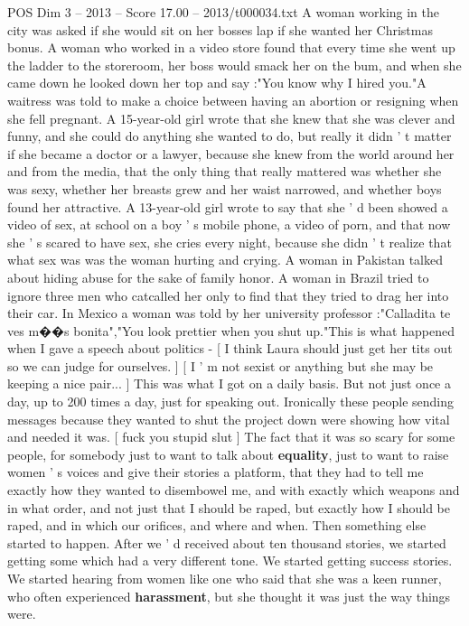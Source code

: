 \begin{textsample}{POS Dim 3 – 2013 – Score 17.00 – 2013/t000034.txt}
A woman working in the city was asked if she would sit on her bosses lap if she wanted her Christmas bonus.
A woman who worked in a video store found that every time she went up the ladder to the storeroom, her boss would smack her on the bum, and when she came down he looked down her top and say :"You know why I hired you."A waitress was told to make a choice between having an abortion or resigning when she fell pregnant.
A 15-year-old girl wrote that she knew that she was clever and funny, and she could do anything she wanted to do, but really it didn ' t matter if she became a doctor or a lawyer, because she knew from the world around her and from the media, that the only thing that really mattered was whether she was sexy, whether her breasts grew and her waist narrowed, and whether boys found her attractive.
A 13-year-old girl wrote to say that she ' d been showed a video of sex, at school on a boy ' s mobile phone, a video of porn, and that now she ' s scared to have sex, she cries every night, because she didn ' t realize that what sex was was the woman hurting and crying.
A woman in Pakistan talked about hiding abuse for the sake of family honor.
A woman in Brazil tried to ignore three men who catcalled her only to find that they tried to drag her into their car.
In Mexico a woman was told by her university professor :"Calladita te ves m{\EmojiFont �}{\EmojiFont �}s bonita","You look prettier when you shut up."This is what happened when I gave a speech about politics - [ I think Laura should just get her tits out so we can judge for ourselves. ] [ I ' m not sexist or anything but she may be keeping a nice pair... ] This was what I got on a daily basis.
But not just once a day, up to 200 times a day, just for speaking out.
Ironically these people sending messages because they wanted to shut the project down were showing how vital and needed it was. [ fuck you stupid slut ] The fact that it was so scary for some people, for somebody just to want to talk about \textbf{equality}, just to want to raise women ' s voices and give their stories a platform, that they had to tell me exactly how they wanted to disembowel me, and with exactly which weapons and in what order, and not just that I should be raped, but exactly how I should be raped, and in which our orifices, and where and when.
Then something else started to happen.
After we ' d received about ten thousand stories, we started getting some which had a very different tone.
We started getting success stories.
We started hearing from women like one who said that she was a keen runner, who often experienced \textbf{harassment}, but she thought it was just the way things were.

\end{textsample}
